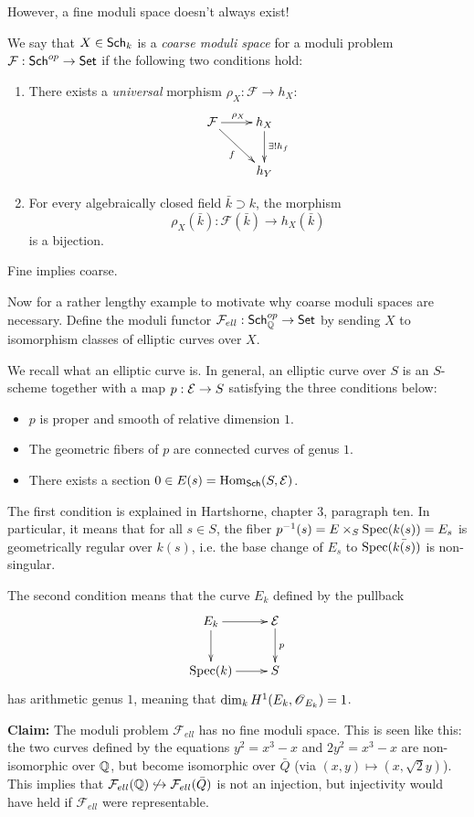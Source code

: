 \documentclass[11pt, english]{article}
\begin{document}
However, a fine moduli space doesn't always exist! 

\begin{defi}
We say that $X \in \mathsf{Sch}_{k}$ is a \emph{coarse moduli space} for a moduli problem $\mathcal F :\mathsf{Sch}^{op} \to \mathsf{Set}$ if the following two conditions hold:
\begin{enumerate}
\item There exists a \emph{universal} morphism $\rho_X : \mathcal{F} \to h_X$:
\[
\xymatrix{
\mathcal F \ar[r]^{\rho_X} \ar[dr]_f & h_X \ar[d]^{\exists ! h_f } \\
 & h_Y
}
\]
\item
For every algebraically closed field $\bar{k} \supset k$, the morphism
\[
\rho_X(\bar{k}):\mathcal F (\bar k) \to h_X(\bar k)
\]
is a bijection.
\end{enumerate}
\end{defi}

\begin{remark} Fine implies coarse. \end{remark}

Now for a rather lengthy example to motivate why coarse moduli spaces are necessary. Define the moduli functor $\mathcal F_{ell}:\mathsf{Sch}_{\mathbb{Q}}^{op} \to \mathsf{Set}$ by sending $X$ to isomorphism classes of elliptic curves over $X$.

We recall what an elliptic curve is. In general, an elliptic curve over $S$ is an $S$-scheme together with a map $p:\mathcal E \to S$ satisfying the three conditions below:
\begin{itemize}
\item $p$ is proper and smooth of relative dimension $1$.
\item The geometric fibers of $p$ are connected curves of genus $1$.
\item There exists a section $0 \in E(s) = \operatorname{Hom}_{\mathsf{Sch}}(S,\mathcal E)$.
\end{itemize}
The first condition is explained in Hartshorne, chapter 3, paragraph ten. In particular, it means that for all $s \in S$, the fiber $p^{-1}(s)=E \times_S \operatorname{Spec}(k(s)) = E_s$ is geometrically regular over $k(s)$, i.e. the base change of $E_s$ to $\operatorname{Spec} (\bar{k(s)})$ is non-singular.

The second condition means that the curve $E_k$ defined by the pullback 
\[
\xymatrix{
E_k \ar[r] \ar[d] & \E \ar[d]^p \\
\Spec(k) \ar[r] & S
}
\]
has arithmetic genus $1$, meaning that $\dim_k H^1(E_k, \operatorname{\mathscr{O}}_{E_k}) = 1$.

\textbf{Claim:} The moduli problem $\mathcal F_{ell}$ has no fine moduli space. This is seen like this: the two curves defined by the equations $y^2=x^3-x$ and $2y^2=x^3-x$ are non-isomorphic over $\mathbb{Q}$, but become isomorphic over $\bar Q$ (via $(x,y) \mapsto (x,\sqrt{2}y)$). This implies that $\mathcal F_{ell} (\mathbb{Q}) \not \hookrightarrow \mathcal F_{ell} (\bar Q)$ is not an injection, but injectivity would have held if $\mathcal F_{ell}$ were representable.
\end{document}
